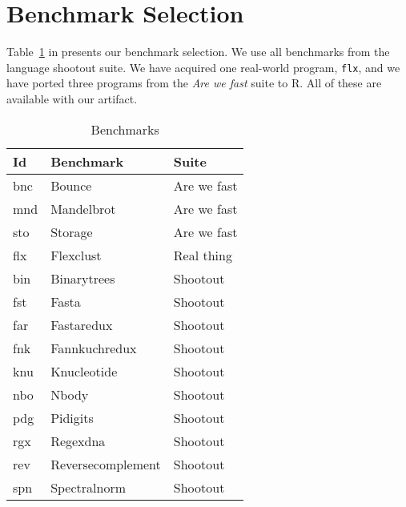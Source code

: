 \documentclass[review,nonacm,screen,acmsmall,anonymous=true]{acmart}
\renewcommand{\c}[1]{\lstinline |#1|\xspace}
\begin{document}
\appendix

\section{Benchmark Selection}

Table~\ref{table:bms} in presents our benchmark selection. We use all benchmarks
from the language shootout suite. We have acquired one real-world program,
\c{flx}, and we have ported three programs from the \emph{Are we fast} suite to
R. All of these are available with our artifact.

\begin{table}[!h]
  \vspace{-3mm}
  \small
  \caption{Benchmarks}\label{table:bms}
  \vspace{-3mm}
  \begin{tabular}{lll}
    \toprule
    \bf Id&\bf Benchmark&\bf Suite\\
    \midrule
    bnc&Bounce&Are we fast\\
    mnd&Mandelbrot&Are we fast\\
    sto&Storage&Are we fast\\
    flx&Flexclust&Real thing\\
    bin&Binarytrees&Shootout\\
    fst&Fasta&Shootout\\
    far&Fastaredux&Shootout\\
    fnk&Fannkuchredux&Shootout\\
    knu&Knucleotide&Shootout\\
    nbo&Nbody&Shootout\\
    pdg&Pidigits&Shootout\\
    rgx&Regexdna&Shootout\\
    rev&Reversecomplement&Shootout\\
    spn&Spectralnorm&Shootout\\
    \bottomrule
  \end{tabular}
\end{table}
\end{document}
